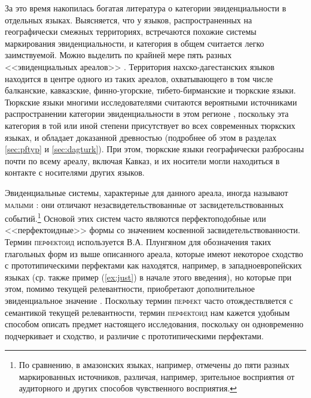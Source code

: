 \par За это время накопилась богатая литература о категории эвиденциальности в отдельных языках. Выясняется, что у языков, распространенных на географически смежных территориях, встречаются похожие системы маркирования эвиденциальности, и категория в общем считается легко заимствуемой. Можно выделить по крайней мере пять разных <<эвиденциальных ареалов>> \citep[19--23]{plungian2010}. Территория нахско-дагестанских языков находится в центре одного из таких ареалов, охватывающего в том числе балканские, кавказские, финно-угорские, тибето-бирманские и тюркские языки. Тюркские языки многими исследователями считаются вероятными источниками распространении категории эвиденциальности в этом регионе \citep[265]{chirikba2003}, поскольку эта категория в той или иной степени присутствует во всех современных тюркских языках, и обладает доказанной древностью (подробнее об этом в разделах \ref{sec:pftyp} и \ref{sec:dagturk}). При этом, тюркские языки географически разбросаны почти по всему ареалу, включая Кавказ, и их носители могли находиться в контакте с носителями других языков. 
\par Эвиденциальные системы, характерные для данного ареала, иногда называют \textsc{малыми} \citep{aikhenvald2004}: они отличают незасвидетельствованные от засвидетельствованных событий.\footnote{По сравнению, в амазонских языках, например, отмечены до пяти разных маркированных источников, различая,  например, зрительное восприятия от аудиторного и других способов чувственного восприятия.} Основой этих систем часто являются перфектоподобные или <<перфектоидные>> формы со значением косвенной засвидетельствованности. Термин \textsc{перфектоид} используется В.А. Плунгяном для обозначения таких глагольных форм из выше описанного ареала, которые имеют некоторое сходство с прототипическими перфектами как находятся, например, в западноевропейских языках (ср. также пример (\ref{ex:just}) в начале этого введения), но которые при этом, помимо текущей релевантности, приобретают дополнительное эвиденциальное значение \citep[14--15]{plungian2016}. Поскольку термин \textsc{перфект} часто отождествляется с семантикой текущей релевантности, термин \textsc{перфектоид} нам кажется удобным способом описать предмет настоящего исследования, поскольку он одновременно подчеркивает и сходство, и различие с прототипическими перфектами.
